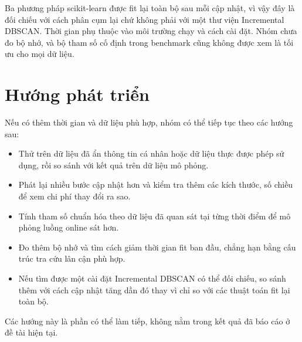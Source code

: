Ba phương pháp scikit-learn được fit lại toàn bộ sau mỗi cập nhật, vì vậy đây là đối chiếu với cách phân cụm lại chứ không phải với một thư viện Incremental DBSCAN. Thời gian phụ thuộc vào môi trường chạy và cách cài đặt. Nhóm chưa đo bộ nhớ, và bộ tham số cố định trong benchmark cũng không được xem là tối ưu cho mọi dữ liệu.

\section{Hướng phát triển}

Nếu có thêm thời gian và dữ liệu phù hợp, nhóm có thể tiếp tục theo các hướng sau:

\begin{itemize}
    \item Thử trên dữ liệu đã ẩn thông tin cá nhân hoặc dữ liệu thực được phép sử dụng, rồi so sánh với kết quả trên dữ liệu mô phỏng.
    \item Phát lại nhiều bước cập nhật hơn và kiểm tra thêm các kích thước, số chiều để xem chi phí thay đổi ra sao.
    \item Tính tham số chuẩn hóa theo dữ liệu đã quan sát tại từng thời điểm để mô phỏng luồng online sát hơn.
    \item Đo thêm bộ nhớ và tìm cách giảm thời gian fit ban đầu, chẳng hạn bằng cấu trúc tra cứu lân cận phù hợp.
    \item Nếu tìm được một cài đặt Incremental DBSCAN có thể đối chiếu, so sánh thêm với cách cập nhật tăng dần đó thay vì chỉ so với các thuật toán fit lại toàn bộ.
\end{itemize}

Các hướng này là phần có thể làm tiếp, không nằm trong kết quả đã báo cáo ở đề tài hiện tại.
